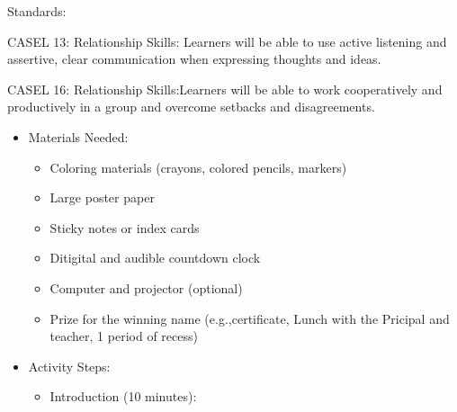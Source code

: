 \documentclass[14pt, letterpaper, twoside]{article}
\begin{document}
	Standards:
	
	CASEL 13: Relationship Skills: Learners will be able to use active listening 	and assertive, clear communication when expressing thoughts and ideas.
	
	CASEL 16: Relationship Skills:Learners will be able to work cooperatively 		and productively in a group and overcome setbacks and disagreements.				\begin{itemize}
		\item Materials Needed:
			\begin{itemize}
    		\item Coloring materials (crayons, colored pencils, markers)
    		\item Large poster paper
    		\item Sticky notes or index cards
    		\item Ditigital and audible countdown clock
    		\item Computer and projector (optional)
    		\item Prize for the winning name (e.g.,certificate, Lunch with the 				Pricipal and teacher, 1 period of recess)
    		\end{itemize}
    	\item Activity Steps:
    		\begin{itemize}
    		\item Introduction (10 minutes):
    		

\end{itemize}
\end{itemize}
\end{document}
